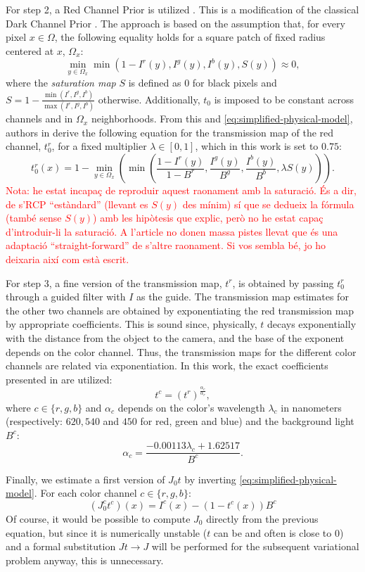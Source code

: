 \documentclass[twocolumn,twoside,a4paper,10pt]{IEEEtran}
\newcommand{\Frank}[1]{\textcolor{red}{#1}}
\begin{document}
For step 2, a Red Channel Prior is utilized \cite{GALDRAN2015132}. This is a
modification of the classical Dark Channel Prior \cite{5567108}. The
approach is based on the assumption that, for every pixel \(x\in\Omega\), the following equality holds for a square patch of fixed radius centered at \(x\), \(\Omega_x\):
\[
  \min_{y\in\Omega_x}\min(1-I^r(y), I^g(y), I^b(y), S(y)) \approx 0
,\]
where the \textit{saturation map} \(S\) is defined as \(0\) for black pixels and \(S=1-\frac{\min(I^r, I^g, I^b)}{\max(I^r, I^g, I^b)}\) otherwise.
Additionally, \(t_0\) is imposed to be constant across channels and in \(\Omega_x\) neighborhoods. From this and \cref{eq:simplified-physical-model}, authors in \cite{GALDRAN2015132} derive the following equation for the transmission map of the red channel, \(t_0^r\), for a fixed multiplier \(\lambda\in[0,1]\), which in this work is set to \(0.75\):
\[
  t_0^r(x) = 1 - \min_{y\in\Omega_x}\left(\min\left(\frac{1-I^r(y)}{1-B^r}, \frac{I^g(y)}{B^g}, \frac{I^b(y)}{B^b}, \lambda S(y)\right)\right)
.\]
\Frank{Nota: he estat incapaç de reproduir aquest raonament amb la saturació. És a dir, de s'RCP ``estàndard'' (llevant es \(S(y)\) des mínim) sí que se dedueix la fórmula (també sense \(S(y)\)) amb les hipòtesis que explic, però no he estat capaç d'introduir-li la saturació. A l'article no donen massa pistes llevat que és una adaptació ``straight-forward'' de s'altre raonament. Si vos sembla bé, jo ho deixaria així com està escrit.}

For step 3, a fine version of the transmission map, \(t^r\), is obtained by passing \(t_0^r\) through a guided filter \cite{6319316} with \(I\) as the guide. The transmission map estimates for the other two channels are obtained by
exponentiating the red transmission map by appropriate coefficients. This is sound since, physically, \(t\) decays exponentially with the distance from the object to the camera, and the base of the exponent depends on the color channel. Thus, the transmission maps for the different color channels are related via exponentiation. In this work, the exact coefficients presented in \cite{7574330} are utilized:
\[
  t^c = (t^r)^\frac{\alpha_c}{\alpha_r}
,\]
where \(c\in\{r,g,b\}\) and \(\alpha_c\) depends on the color's wavelength \(\lambda_c\) in nanometers (respectively: \(620, 540\) and \(450\) for red, green and blue) and the background light \(B^c\):
\[
  \alpha_c = \frac{-0.00113\lambda_c + 1.62517}{B^c}
.\]

Finally, we estimate a first version of \(J_0t\) by inverting \cref{eq:simplified-physical-model}. For each color channel \(c\in\{r, g, b\}\):
\begin{equation}\label{eq:J0}
  (J^c_0t^c)(x) = I^c(x) - (1-t^c(x))B^c
\end{equation}
Of course, it would be possible to compute \(J_0\) directly from the previous equation, but since it is numerically unstable (\(t\) can be and often is close to \(0\)) and a formal substitution \(Jt\to J\) will be performed for the subsequent variational problem anyway, this is unnecessary.
\end{document}
